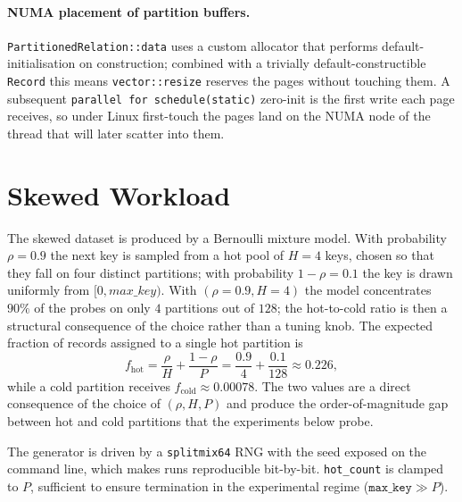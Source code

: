 \documentclass[10pt,twocolumn,a4paper]{article}
\begin{document}
\paragraph{NUMA placement of partition buffers.}
\texttt{PartitionedRelation::data} uses a custom allocator that
performs default-initialisation on construction; combined with a
trivially default-constructible \texttt{Record} this means
\texttt{vector::resize} reserves the pages without touching them.
A subsequent \texttt{parallel for schedule(static)} zero-init is
the first write each page receives, so under Linux first-touch the
pages land on the NUMA node of the thread that will later scatter
into them.

\section{Skewed Workload}\label{sec:skew}
The skewed dataset is produced by a Bernoulli mixture model. With
probability $\rho=0.9$ the next key is sampled from a hot pool of
$H=4$ keys, chosen so that they fall on four distinct partitions;
with probability $1-\rho=0.1$ the key is drawn uniformly from
$[0,\textit{max\_key})$. With $(\rho{=}0.9, H{=}4)$ the model concentrates $90\%$ of the
probes on only $4$ partitions out of $128$; the hot-to-cold ratio
is then a structural consequence of the choice rather than a
tuning knob. The expected fraction of records assigned to a
single hot partition is
\[
  f_{\text{hot}} = \frac{\rho}{H} + \frac{1-\rho}{P}
                 = \frac{0.9}{4} + \frac{0.1}{128}
                 \approx 0.226,
\]
while a cold partition receives $f_{\text{cold}}\approx 0.00078$. The
two values are a direct consequence of the choice of $(\rho,H,P)$
and produce the order-of-magnitude gap between hot and cold
partitions that the experiments below probe.

The generator is driven by a \texttt{splitmix64} RNG with the seed
exposed on the command line, which makes runs reproducible
bit-by-bit. \texttt{hot\_count} is clamped to $P$, sufficient to
ensure termination in the experimental regime
($\texttt{max\_key}\gg P$).

\end{document}
